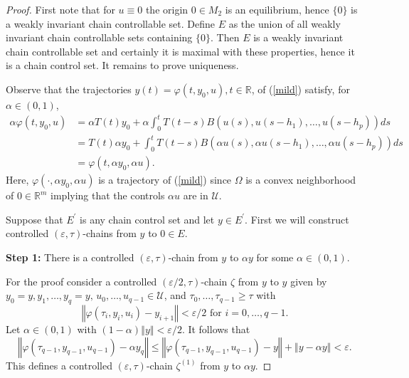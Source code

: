 \documentclass{siamltex}%
\begin{document}
\begin{proof}
First note that for $u\equiv0$ the origin $0\in M_{2}$ is an equilibrium,
hence $\{0\}$ is a weakly invariant chain controllable set. Define $E$ as the
union of all weakly invariant chain controllable sets containing $\{0\}$. Then
$E$ is a weakly invariant chain controllable set and certainly it is maximal
with these properties, hence it is a chain control set. It remains to prove uniqueness.

Observe that the trajectories $y(t)=\varphi(t,y_{0},u),t\in\mathbb{R}$, of
(\ref{mild}) satisfy, for $\alpha\in(0,1)$,%
\begin{align}
\alpha\varphi(t,y_{0},u)  &  =\alpha T(t)y_{0}+\alpha\int_{0}^{t}%
T(t-s)B\left(  u(s),u(s-h_{1}),\ldots,u(s-h_{p})\right)  ds\nonumber\\
&  =T(t)\alpha y_{0}+\int_{0}^{t}T(t-s)B\left(  \alpha u(s),\alpha
u(s-h_{1}),\ldots,\alpha u(s-h_{p})\right)  ds\nonumber\\
&  =\varphi(t,\alpha y_{0},\alpha u). \label{alpha1}%
\end{align}
Here, $\varphi(\cdot,\alpha y_{0},\alpha u)$ is a trajectory of (\ref{mild})
since $\Omega$ is a convex neighborhood of $0\in\mathbb{R}^{m}$ implying that
the controls $\alpha u$ are in $\mathcal{U}$.

Suppose that $E^{\prime}$ is any chain control set and let $y\in E^{\prime}$.
First we will construct controlled $(\varepsilon,\tau)$-chains from $y$ to
$0\in E$.

\textbf{Step 1:} There is a controlled $(\varepsilon,\tau)$-chain from $y$ to
$\alpha y$ for some $\alpha\in(0,1)$.

For the proof consider a controlled $(\varepsilon/2,\tau)$-chain $\zeta$ from
$y$ to $y$ given by $y_{0}=y,y_{1},\ldots,y_{q}=y,\,u_{0},\ldots,u_{q-1}%
\in\mathcal{U}$, and $\tau_{0},\ldots,\tau_{q-1}\geq\tau$ with%
\[
\left\Vert \varphi(\tau_{i},y_{i},u_{i})-y_{i+1}\right\Vert <\varepsilon
/2\text{ for }i=0,\ldots,q-1.
\]
Let $\alpha\in(0,1)$ with $(1-\alpha)\left\Vert y\right\Vert <\varepsilon/2$.
It follows that%
\[
\left\Vert \varphi(\tau_{q-1},y_{q-1},u_{q-1})-\alpha y_{q}\right\Vert
\leq\left\Vert \varphi(\tau_{q-1},y_{q-1},u_{q-1})-y\right\Vert +\left\Vert
y-\alpha y\right\Vert <\varepsilon.
\]
This defines a controlled $(\varepsilon,\tau)$-chain $\zeta^{(1)}$ from $y$ to
$\alpha y$.


\end{proof}
\end{document}
